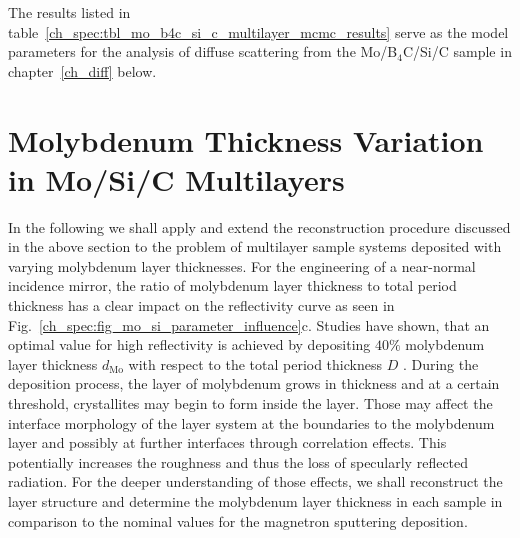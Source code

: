 The results listed in table~\ref{ch_spec:tbl_mo_b4c_si_c_multilayer_mcmc_results} serve as the model parameters for the analysis of diffuse scattering from the Mo/B$_4$C/Si/C sample in chapter~\ref{ch_diff} below.

\section{Molybdenum Thickness Variation in Mo/Si/C Multilayers} \label{ch_spec:sec_mo_si_c}
In the following we shall apply and extend the reconstruction procedure discussed in the above section to the problem of multilayer sample systems deposited with varying molybdenum layer thicknesses. For the engineering of a near-normal incidence mirror, the ratio of molybdenum layer thickness to total period thickness has a clear impact on the reflectivity curve as seen in Fig.~\ref{ch_spec:fig_mo_si_parameter_influence}c. Studies have shown, that an optimal value for high reflectivity is achieved by depositing $40\%$ molybdenum layer thickness $d_\text{Mo}$ with respect to the total period thickness $D$ \cite{bajt_investigation_2001,braun_mo/si_2002}. During the deposition process, the layer of molybdenum grows in thickness and at a certain threshold, crystallites may begin to form \cite{verhoeven_ion_1992,bajt_investigation_2001} inside the layer. Those may affect the interface morphology of the layer system at the boundaries to the molybdenum layer and possibly at further interfaces through correlation effects. This potentially increases the roughness and thus the loss of specularly reflected radiation. For the deeper understanding of those effects, we shall reconstruct the layer structure and determine the molybdenum layer thickness in each sample in comparison to the nominal values for the magnetron sputtering deposition.

